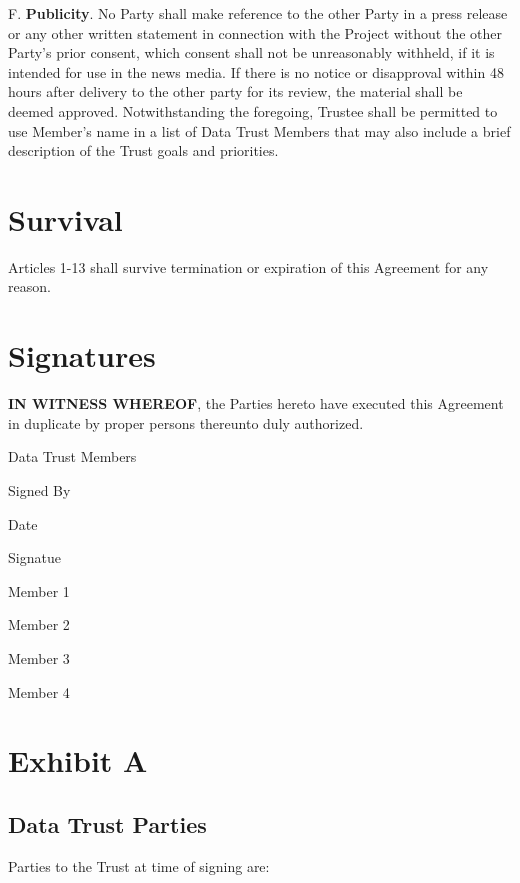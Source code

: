 \documentclass[]{book}
\begin{document}
F. \textbf{Publicity}. No Party shall make reference to the other Party in a press release or any other written statement in connection with the Project without the other Party's prior consent, which consent shall not be unreasonably withheld, if it is intended for use in the news media. If there is no notice or disapproval within 48 hours after delivery to the other party for its review, the material shall be deemed approved. Notwithstanding the foregoing, Trustee shall be permitted to use Member's name in a list of Data Trust Members that may also include a brief description of the Trust goals and priorities.

\hypertarget{survival}{%
\chapter{Survival}\label{survival}}

Articles 1-13 shall survive termination or expiration of this Agreement for any reason.

\hypertarget{signatures}{%
\chapter{Signatures}\label{signatures}}

\textbf{IN WITNESS WHEREOF}, the Parties hereto have executed this Agreement in duplicate by proper persons thereunto duly authorized.

Data Trust Members

Signed By

Date

Signatue

Member 1

Member 2

Member 3

Member 4

\hypertarget{exhibit-a}{%
\chapter*{Exhibit A}\label{exhibit-a}}

\hypertarget{data-trust-parties}{%
\section*{Data Trust Parties}\label{data-trust-parties}}

Parties to the Trust at time of signing are:
\end{document}
